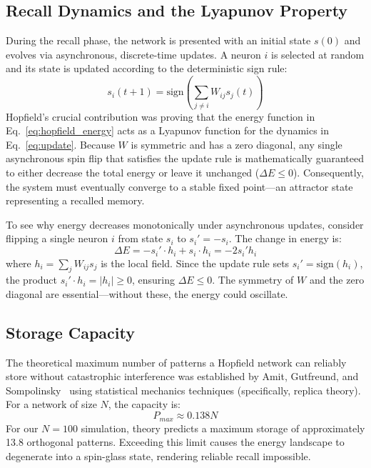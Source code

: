 \documentclass[11pt,a4paper,twocolumn]{article}
\begin{document}
\subsection{Recall Dynamics and the Lyapunov Property}
\label{sec:lyapunov}

During the recall phase, the network is presented with an initial state
$s(0)$ and evolves via asynchronous, discrete-time updates. A neuron $i$ is
selected at random and its state is updated according to the deterministic
sign rule:
\begin{equation}
s_i(t+1) = \text{sign}\left(\sum_{j \neq i} W_{ij} s_j(t)\right)
\label{eq:update}
\end{equation}
Hopfield's crucial contribution was proving that the energy function in
Eq.~\eqref{eq:hopfield_energy} acts as a Lyapunov function for the dynamics
in Eq.~\eqref{eq:update}. Because $W$ is symmetric and has a zero diagonal,
any single asynchronous spin flip that satisfies the update rule is
mathematically guaranteed to either decrease the total energy or leave it
unchanged ($\Delta E \leq 0$). Consequently, the system must eventually
converge to a stable fixed point---an attractor state representing a recalled
memory.

To see why energy decreases monotonically under asynchronous updates, consider
flipping a single neuron $i$ from state $s_i$ to $s_i' = -s_i$. The change in
energy is:
\begin{equation}
\Delta E = -s_i' \cdot h_i + s_i \cdot h_i = -2 s_i' h_i
\label{eq:delta_e}
\end{equation}
where $h_i = \sum_{j} W_{ij} s_j$ is the local field. Since the update rule
sets $s_i' = \text{sign}(h_i)$, the product
$s_i' \cdot h_i = |h_i| \geq 0$, ensuring $\Delta E \leq 0$. The symmetry of
$W$ and the zero diagonal are essential---without these, the energy could
oscillate.

\subsection{Storage Capacity}
\label{sec:capacity_theory}

The theoretical maximum number of patterns a Hopfield network can reliably
store without catastrophic interference was established by Amit, Gutfreund,
and Sompolinsky~\cite{amit1985} using statistical mechanics techniques
(specifically, replica theory). For a network of size $N$, the capacity is:
\begin{equation}
P_{max} \approx 0.138N
\label{eq:capacity_limit}
\end{equation}
For our $N=100$ simulation, theory predicts a maximum storage of approximately
13.8 orthogonal patterns. Exceeding this limit causes the energy landscape to
degenerate into a spin-glass state, rendering reliable recall impossible.
\end{document}
